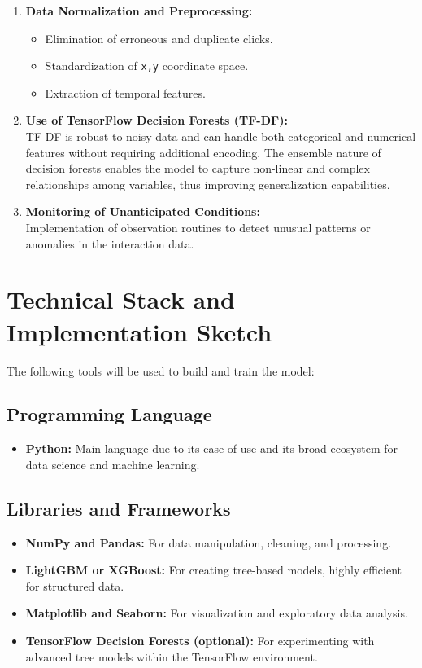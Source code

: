 \documentclass{article}
\begin{document}
\begin{enumerate}
    \item \textbf{Data Normalization and Preprocessing:}
    \begin{itemize}
        \item Elimination of erroneous and duplicate clicks.
        \item Standardization of \texttt{x,y} coordinate space.
        \item Extraction of temporal features.
    \end{itemize}
    
    \item \textbf{Use of TensorFlow Decision Forests (TF-DF):} \\
    TF-DF is robust to noisy data and can handle both categorical and numerical features without requiring additional encoding. The ensemble nature of decision forests enables the model to capture non-linear and complex relationships among variables, thus improving generalization capabilities.

    \item \textbf{Monitoring of Unanticipated Conditions:} \\
    Implementation of observation routines to detect unusual patterns or anomalies in the interaction data.
\end{enumerate}

\section{Technical Stack and Implementation Sketch}

The following tools will be used to build and train the model:

\subsection*{Programming Language}
\begin{itemize}
  \item \textbf{Python:} Main language due to its ease of use and its broad ecosystem for data science and machine learning.
\end{itemize}

\subsection*{Libraries and Frameworks}
\begin{itemize}
  \item \textbf{NumPy and Pandas:} For data manipulation, cleaning, and processing.
  \item \textbf{LightGBM or XGBoost:} For creating tree-based models, highly efficient for structured data.
  \item \textbf{Matplotlib and Seaborn:} For visualization and exploratory data analysis.
  \item \textbf{TensorFlow Decision Forests (optional):} For experimenting with advanced tree models within the TensorFlow environment.
\end{itemize}
\end{document}
